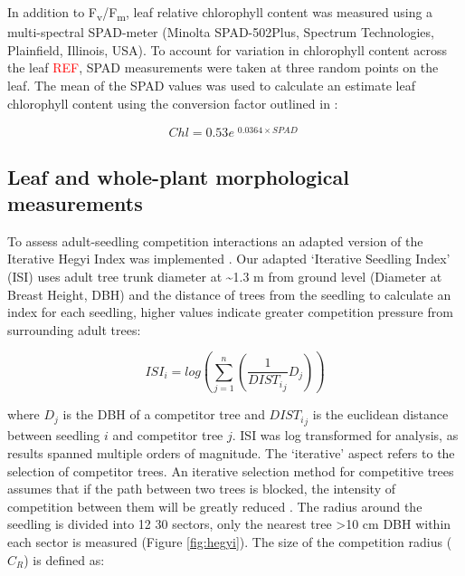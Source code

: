 \documentclass[a4paper,11pt]{article}
\newcommand{\todo}[1]{\textcolor{red}{#1}}   %
\begin{document}
In addition to F\textsubscript{v}/F\textsubscript{m}, leaf relative chlorophyll content was measured using a multi-spectral SPAD-meter (Minolta SPAD-502Plus, Spectrum Technologies, Plainfield, Illinois, USA). To account for variation in chlorophyll content across the leaf \todo{REF}, SPAD measurements were taken at three random points on the leaf. The mean of the SPAD values was used to calculate an estimate leaf chlorophyll content using the conversion factor outlined in \citep{}:

\begin{equation} \label{eq:chl-spad}
Chl = 0.53e^{\begin{matrix} 0.0364 \times SPAD \end{matrix}}
\end{equation}


\subsection*{Leaf and whole-plant morphological measurements}

To assess adult-seedling competition interactions an adapted version of the Iterative Hegyi Index was implemented \citep{Hegyi1974, Lee2004, Seifert2014}. Our adapted `Iterative Seedling Index' (ISI) uses adult tree trunk diameter at \textasciitilde 1.3 m from ground level (Diameter at Breast Height, DBH) and the distance of trees from the seedling to calculate an index for each seedling, higher values indicate greater competition pressure from surrounding adult trees:

\begin{equation}
\label{eq:ISI}
ISI_i = log(\sum_{j=1}^n (\frac{1}{{DIST_i}_j} D_j))
\end{equation}

where $D_j$ is the DBH of a competitor tree and ${{DIST_i}_j}$ is the euclidean distance between seedling $i$ and competitor tree $j$. ISI was log transformed for analysis, as results spanned multiple orders of magnitude. The `iterative' aspect refers to the selection of competitor trees. An iterative selection method for competitive trees assumes that if the path between two trees is blocked, the intensity of competition between them will be greatly reduced \citep{Gadow1999}. The radius around the seedling is divided into 12 30\textdegree{} sectors, only the nearest tree \textgreater{}10 cm DBH within each sector is measured (Figure \ref{fig:hegyi}). The size of the competition radius ($C_R$) is defined as:
\end{document}
